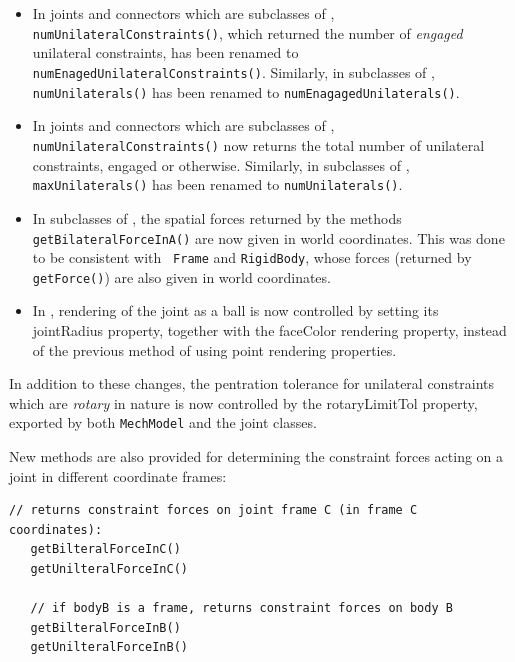 \documentclass{article}
\begin{document}
\begin{itemize}

\item In joints and connectors which are subclasses of 
, {\tt
numUnilateralConstraints()}, which returned the number of {\it
engaged} unilateral constraints, has been renamed to {\tt
numEnagedUnilateralConstraints()}. Similarly, in subclasses of
, {\tt
numUnilaterals()} has been renamed to {\tt numEnagagedUnilaterals()}.

\item In joints and connectors which are subclasses of
, {\tt
numUnilateralConstraints()} now returns the total number of unilateral
constraints, engaged or otherwise.  Similarly, in subclasses of
, {\tt
maxUnilaterals()} has been renamed to {\tt numUnilaterals()}.

\item In subclasses of
, the spatial
forces returned by the methods {\tt getBilateralForceInA()} are now
given in world coordinates. This was done to be consistent with {\tt
Frame} and {\tt RigidBody}, whose forces (returned by {\tt getForce()})
are also given in world coordinates.

\item In ,
rendering of the joint as a ball is now controlled by setting its {\sf
jointRadius} property, together with the {\sf faceColor} rendering
property, instead of the previous method of using point rendering
properties.

\end{itemize}

In addition to these changes, the pentration tolerance for unilateral
constraints which are {\it rotary} in nature is now controlled by the
{\sf rotaryLimitTol} property, exported by both {\tt MechModel} and
the joint classes.

New methods are also provided for determining the constraint forces
acting on a joint in different coordinate frames:
%
\begin{lstlisting}[]
   // returns constraint forces on joint frame C (in frame C coordinates):
   getBilteralForceInC()
   getUnilteralForceInC()

   // if bodyB is a frame, returns constraint forces on body B
   getBilteralForceInB()
   getUnilteralForceInB()
\end{lstlisting}
%
\end{document}
